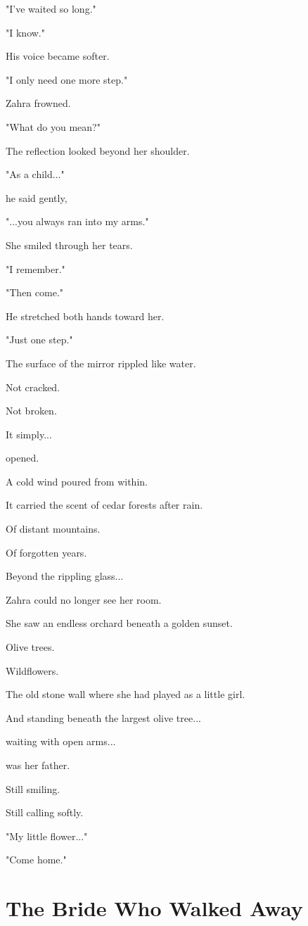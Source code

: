 \documentclass[12pt,openany]{book}
\begin{document}
"I've waited so long."

"I know."

His voice became softer.

"I only need one more step."

Zahra frowned.

"What do you mean?"

The reflection looked beyond her shoulder.

"As a child..."

he said gently,

"...you always ran into my arms."

She smiled through her tears.

"I remember."

"Then come."

He stretched both hands toward her.

"Just one step."

The surface of the mirror rippled like water.

Not cracked.

Not broken.

It simply...

opened.

A cold wind poured from within.

It carried the scent of cedar forests after rain.

Of distant mountains.

Of forgotten years.

Beyond the rippling glass...

Zahra could no longer see her room.

She saw an endless orchard beneath a golden sunset.

Olive trees.

Wildflowers.

The old stone wall where she had played as a little girl.

And standing beneath the largest olive tree...

waiting with open arms...

was her father.

Still smiling.

Still calling softly.

"My little flower..."

"Come home."
\section*{The Bride Who Walked Away}
\end{document}
